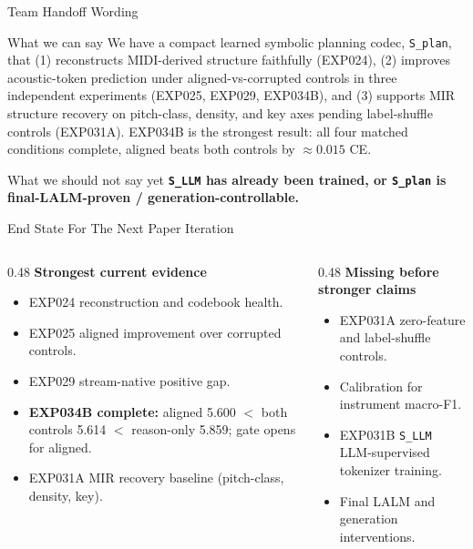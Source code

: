 \documentclass[aspectratio=169,11pt]{beamer}
\newcommand{\stage}[1]{{\color{deckaccent}\textbf{#1}}}
\newcommand{\missing}[1]{{\color{missingred}\textbf{#1}}}
\newcommand{\code}[1]{\texttt{\footnotesize #1}}
\begin{document}
\begin{frame}{Team Handoff Wording}
  \footnotesize
  \begin{block}{What we can say}
    We have a compact learned symbolic planning codec, \code{S\_plan}, that (1) reconstructs MIDI-derived structure faithfully (EXP024), (2) improves acoustic-token prediction under aligned-vs-corrupted controls in three independent experiments (EXP025, EXP029, EXP034B), and (3) supports MIR structure recovery on pitch-class, density, and key axes pending label-shuffle controls (EXP031A). EXP034B is the strongest result: all four matched conditions complete, aligned beats both controls by $\approx 0.015$ CE.
  \end{block}

  \vspace{0.3cm}
  \begin{block}{What we should not say yet}
    \missing{\code{S\_LLM} has already been trained, or \code{S\_plan} is final-LALM-proven / generation-controllable.}
  \end{block}
\end{frame}

\begin{frame}{End State For The Next Paper Iteration}
  \footnotesize
  \begin{columns}[T,onlytextwidth]
    \begin{column}{0.48\linewidth}
      \stage{Strongest current evidence}
      \begin{itemize}
        \item EXP024 reconstruction and codebook health.
        \item EXP025 aligned improvement over corrupted controls.
        \item EXP029 stream-native positive gap.
        \item \textbf{EXP034B complete:} aligned 5.600 $<$ both controls 5.614 $<$ reason-only 5.859; gate opens for aligned.
        \item EXP031A MIR recovery baseline (pitch-class, density, key).
      \end{itemize}
    \end{column}
    \begin{column}{0.48\linewidth}
      \missing{Missing before stronger claims}
      \begin{itemize}
        \item EXP031A zero-feature and label-shuffle controls.
        \item Calibration for instrument macro-F1.
        \item EXP031B \code{S\_LLM} LLM-supervised tokenizer training.
        \item Final LALM and generation interventions.
      \end{itemize}
    \end{column}
  \end{columns}
\end{frame}
\end{document}
